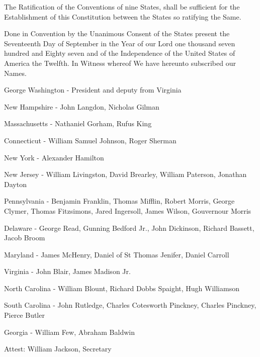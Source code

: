 \documentclass[12pt]{constitution}
\begin{document}

The Ratification of the Conventions of nine States, shall be sufficient for the
Establishment of this Constitution between the States so ratifying the Same.

Done in Convention by the Unanimous Consent of the States present the
Seventeenth Day of September in the Year of our Lord one thousand seven hundred
and Eighty seven and of the Independence of the United States of America the
Twelfth. In Witness whereof We have hereunto subscribed our Names.

George Washington - President and deputy from Virginia

New Hampshire - John Langdon, Nicholas Gilman

Massachusetts - Nathaniel Gorham, Rufus King

Connecticut - William Samuel Johnson, Roger Sherman

New York - Alexander Hamilton

New Jersey - William Livingston, David Brearley, William Paterson, Jonathan
Dayton

Pennsylvania - Benjamin Franklin, Thomas Mifflin, Robert Morris, George Clymer,
Thomas Fitzsimons, Jared Ingersoll, James Wilson, Gouvernour Morris

Delaware - George Read, Gunning Bedford Jr., John Dickinson, Richard Bassett,
Jacob Broom

Maryland - James McHenry, Daniel of St Thomas Jenifer, Daniel Carroll

Virginia - John Blair, James Madison Jr.

North Carolina - William Blount, Richard Dobbs Spaight, Hugh Williamson

South Carolina - John Rutledge, Charles Cotesworth Pinckney, Charles Pinckney,
Pierce Butler

Georgia - William Few, Abraham Baldwin

Attest: William Jackson, Secretary
\end{document}
